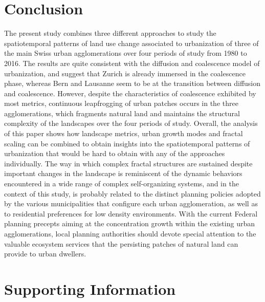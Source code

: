 \documentclass[10pt,letterpaper]{article}
\begin{document}
\section*{Conclusion}

The present study combines three different approaches to study the spatiotemporal patterns of land use change associated to urbanization of three of the main Swiss urban agglomerations over four periods of study from 1980 to 2016.
The results are quite consistent with the diffusion and coalescence model of urbanization, and suggest that Zurich is already immersed in the coalescence phase, whereas Bern and Lausanne seem to be at the transition between diffusion and coalescence.
However, despite the characteristics of coalescence exhibited by most metrics, continuous leapfrogging of urban patches occurs in the three agglomerations, which fragments natural land and maintains the structural complexity of the landscapes over the four periods of study.
Overall, the analysis of this paper shows how landscape metrics, urban growth modes and fractal scaling can be combined to obtain insights into the spatiotemporal patterns of urbanization that would be hard to obtain with any of the approaches individually. %
The way in which complex fractal structures are sustained despite important changes in the landscape is reminiscent of the dynamic behaviors encountered in a wide range of complex self-organizing systems, and in the context of this study, is probably related to the distinct planning policies adopted by the various municipalities that configure each urban agglomeration, as well as to residential preferences for low density environments.
With the current Federal planning precepts aiming at the concentration growth within the existing urban agglomerations, local planning authorities should devote special attention to the valuable ecosystem services that the persisting patches of natural land can provide to urban dwellers.



\section*{Supporting Information}
\end{document}
